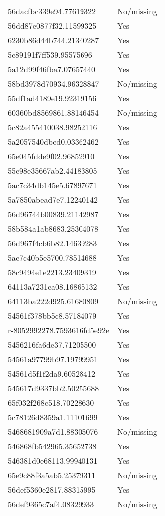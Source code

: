 \begin{tabular}{ll}
56dacfbc339e94.77619322 & No/missing \\
56dd87e0877f32.11599325 & Yes \\
6230b86d44b744.21340287 & Yes \\
5c89191f7ff539.95575696 & Yes \\
5a12d99f46fba7.07657440 & Yes \\
58bd3978d70934.96328847 & No/missing \\
55df1ad4189e19.92319156 & Yes \\
60360bd8569861.88146454 & No/missing \\
5c82a455410038.98252116 & Yes \\
5a2057540dbed0.03362462 & Yes \\
65e045fdde9f02.96852910 & Yes \\
55e98e35667ab2.44183805 & Yes \\
5ac7c34db145e5.67897671 & Yes \\
5a7850abead7e7.12240142 & Yes \\
56d96744b00839.21142987 & Yes \\
58b584a1ab8683.25304078 & Yes \\
56d967f4cb6b82.14639283 & Yes \\
5ac7c40b5e5700.78514688 & Yes \\
58c9494e1e2213.23409319 & Yes \\
64113a7231ea08.16865132 & Yes \\
64113ba222d925.61680809 & No/missing \\
54561f378bb5c8.57184079 & Yes \\
r-8052992278.7593616fd5e92e & Yes \\
5456216fa6de37.71205500 & Yes \\
54561a97799b97.19799951 & Yes \\
54561d5f1f2da9.60528412 & Yes \\
545617d9337bb2.50255688 & Yes \\
65f032f268c518.70228630 & Yes \\
5c78126d8359a1.11101699 & Yes \\
5468681909a7d1.88305076 & No/missing \\
546868fb542965.35652738 & Yes \\
546381d0e68113.99940131 & Yes \\
65e9c88f3a5ab5.25379311 & No/missing \\
56def5360e2817.88315995 & Yes \\
56def9365c7af4.08329933 & No/missing \\

\end{tabular}
